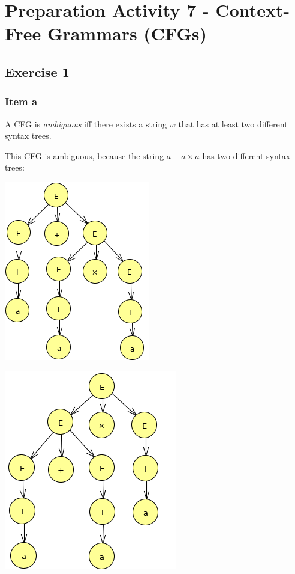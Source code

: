 \setcounter{section}{6}
\section{Preparation Activity 7 - Context-Free Grammars (CFGs)}
{
\renewcommand{\thesubsubsection}{\thesubsection\alph{subsubsection}}
\subsection{Exercise 1}
\subsubsection{Item a}
\begin{definition}
A CFG is \textit{ambiguous} iff there exists a string $w$ that has at least two different syntax trees.
\end{definition}
This CFG is ambiguous, because the string $a+a \times a$ has two different syntax trees:
\begin{center}
\begin{minipage}{0.4\linewidth}
	\begin{center} \includegraphics[scale=0.45]{PA07_1a_1} \end{center}
\end{minipage}
\begin{minipage}{0.4\linewidth}
	\begin{center} \includegraphics[scale=0.45]{PA07_1a_2} \end{center}
\end{minipage}
\end{center}
}
